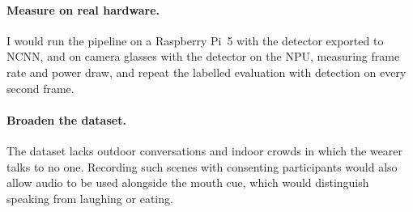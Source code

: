 \paragraph{Measure on real hardware.}
I would run the pipeline on a Raspberry Pi~5 with the detector exported to NCNN, and on
camera glasses with the detector on the NPU, measuring frame rate and power draw, and repeat
the labelled evaluation with detection on every second frame.

\paragraph{Broaden the dataset.}
The dataset lacks outdoor conversations and indoor crowds in which the wearer talks to no
one. Recording such scenes with consenting participants would also allow audio to be used
alongside the mouth cue, which would distinguish speaking from laughing or eating.
